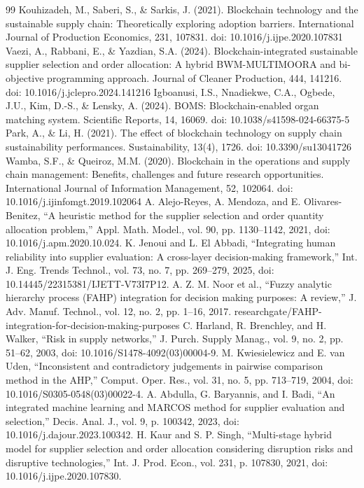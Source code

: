 \documentclass[11pt]{article}
\begin{document}
\begin{thebibliography}{99}
 Kouhizadeh, M., Saberi, S., \& Sarkis, J. (2021). Blockchain technology and the sustainable supply chain: Theoretically exploring adoption barriers. International Journal of Production Economics, 231, 107831. doi: 10.1016/j.ijpe.2020.107831
 Vaezi, A., Rabbani, E., \& Yazdian, S.A. (2024). Blockchain-integrated sustainable supplier selection and order allocation: A hybrid BWM-MULTIMOORA and bi-objective programming approach. Journal of Cleaner Production, 444, 141216. doi: 10.1016/j.jclepro.2024.141216
 Igboanusi, I.S., Nnadiekwe, C.A., Ogbede, J.U., Kim, D.-S., \& Lensky, A. (2024). BOMS: Blockchain-enabled organ matching system. Scientific Reports, 14, 16069. doi: 10.1038/s41598-024-66375-5
 Park, A., \& Li, H. (2021). The effect of blockchain technology on supply chain sustainability performances. Sustainability, 13(4), 1726. doi: 10.3390/su13041726
 Wamba, S.F., \& Queiroz, M.M. (2020). Blockchain in the operations and supply chain management: Benefits, challenges and future research opportunities. International Journal of Information Management, 52, 102064. doi: 10.1016/j.ijinfomgt.2019.102064
 A. Alejo-Reyes, A. Mendoza, and E. Olivares-Benitez, ``A heuristic method for the supplier selection and order quantity allocation problem,'' Appl. Math. Model., vol. 90, pp. 1130--1142, 2021, doi: 10.1016/j.apm.2020.10.024.
 K. Jenoui and L. El Abbadi, ``Integrating human reliability into supplier evaluation: A cross-layer decision-making framework,'' Int. J. Eng. Trends Technol., vol. 73, no. 7, pp. 269--279, 2025, doi: 10.14445/22315381/IJETT-V73I7P12.
 A. Z. M. Noor et al., ``Fuzzy analytic hierarchy process (FAHP) integration for decision making purposes: A review,'' J. Adv. Manuf. Technol., vol. 12, no. 2, pp. 1--16, 2017. researchgate/FAHP-integration-for-decision-making-purposes
 C. Harland, R. Brenchley, and H. Walker, ``Risk in supply networks,'' J. Purch. Supply Manag., vol. 9, no. 2, pp. 51--62, 2003, doi: 10.1016/S1478-4092(03)00004-9.
 M. Kwiesielewicz and E. van Uden, ``Inconsistent and contradictory judgements in pairwise comparison method in the AHP,'' Comput. Oper. Res., vol. 31, no. 5, pp. 713--719, 2004, doi: 10.1016/S0305-0548(03)00022-4.
 A. Abdulla, G. Baryannis, and I. Badi, ``An integrated machine learning and MARCOS method for supplier evaluation and selection,'' Decis. Anal. J., vol. 9, p. 100342, 2023, doi: 10.1016/j.dajour.2023.100342.
 H. Kaur and S. P. Singh, ``Multi-stage hybrid model for supplier selection and order allocation considering disruption risks and disruptive technologies,'' Int. J. Prod. Econ., vol. 231, p. 107830, 2021, doi: 10.1016/j.ijpe.2020.107830.

\end{thebibliography}
\end{document}

